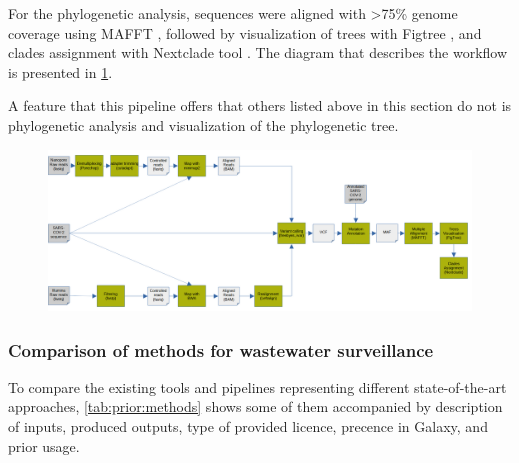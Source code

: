         For the phylogenetic analysis, sequences were aligned with >75\% genome coverage using MAFFT \cite{mafft}, followed by visualization of trees with Figtree \cite{figtree}, and clades assignment with Nextclade tool \cite{nextclade2022}. The diagram that describes the workflow is presented in \cref{fig:prior:izquierdo}.
        
        A feature that this pipeline offers that others listed above in this section do not is phylogenetic analysis and visualization of the phylogenetic tree.
        \begin{landscape}
        \centering\vspace*{\fill}
        \begin{figure}[ht!]
        	\centering
            \includegraphics[width=1.4\textwidth]{figures/prior/Izquierdo-Lara.png}
            \label{fig:prior:izquierdo}
        \end{figure}
        \vfill
        \end{landscape}
        
        
        \subsubsection{Comparison of methods for wastewater surveillance}
        To compare the existing tools and pipelines representing different state-of-the-art approaches, \cref{tab:prior:methods} shows some of them accompanied by description of inputs, produced outputs, type of provided licence, precence in Galaxy, and prior usage.
        
